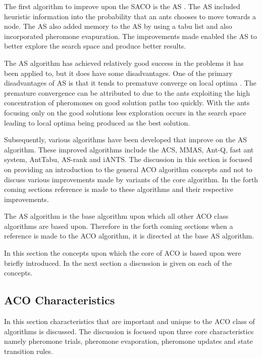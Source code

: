 The first algorithm to improve upon the \gls{SACO} is the \gls{AS} \cite{CompuIntelligenceIntro,AntIntroTrends}. The \gls{AS} included heuristic information into the probability that an ants chooses to move towards a node. The \gls{AS} also added memory to the \gls{AS} by using a tabu list and also incorporated pheromone evapuration. The improvements made enabled the \gls{AS} to better explore the search space and produce better results\cite{CompuIntelligenceIntro,AntIntroTrends}. 

The \gls{AS} algorithm has achieved relatively good success in the problems it has been applied to, but it does have some disadvantages\cite{ImpACOComplex,ACOSurvey}. One of the primary disadvantages of \gls{AS} is that it tends to prematuve converge on local optima \cite{FundamentalSwarm,ImpACOComplex}. The premature convergence can be attributed to due to the ants exploiting the high concentration of pheromones on good solution paths too quickly\cite{FundamentalSwarm}. With the ants focusing only on the good solutions less exploration occurs in the search space leading to local optima being produced as the best solution\cite{FundamentalSwarm}.

Subsequently, various algorithms have been developed that improve on the \gls{AS} algorithm. These improved algorithms include the \gls{ACS}, \gls{MMAS}, Ant-Q, fast ant system, AntTabu, \gls{AS}-rank and i\gls{ANTS}\cite{CompuIntelligenceIntro,AntIntroTrends}. The discussion in this section is focused on providing an introduction to the general \gls{ACO} algorithm concepts and not to discuss various improvements made by variants of the core algorithm. In the forth coming sections reference is made to these algorithms and their respective improvements.

The \gls{AS} algorithm is the base algorithm upon which all other \gls{ACO} class algorithms are based upon. Therefore in the forth coming sections when a reference is made to the \gls{ACO} algorithm, it is directed at the base \gls{AS} algorithm.

In this section the concepts  upon which the core of \gls{ACO} is based upon were briefly introduced. In the next section a discussion is given on each of the concepts.
\subsection{ACO Characteristics}
\label{sec:ACOcharacter}
In this section characteristics that are important and unique to the \gls{ACO} class of algorithms is discussed. The discussion is focused upon three core characteristics namely pheromone trials, pheromone evaporation, pheromone updates and state transition rules.
